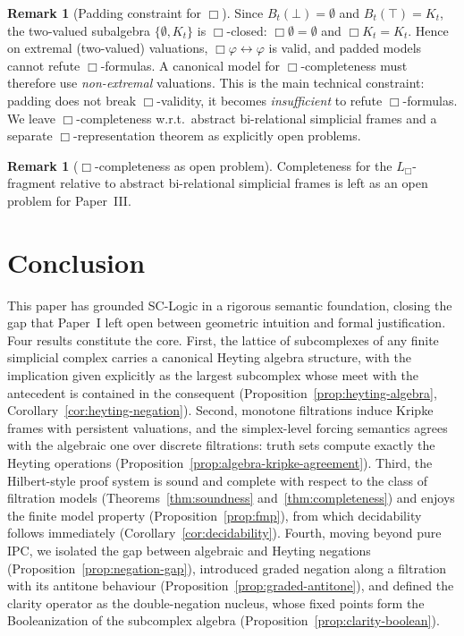 \documentclass[final,12pt]{elsarticle}
\theoremstyle{plain}
\theoremstyle{definition}
\newtheorem{rem}[thm]{Remark}
\begin{document}
\begin{rem}[Padding constraint for \(\Box\)]
\label{rem:box-padding}
Since \(B_t(\bot)=\emptyset\) and \(B_t(\top)=K_t\), the two-valued subalgebra
\(\{\emptyset, K_t\}\) is \(\Box\)-closed: \(\Box\emptyset=\emptyset\) and
\(\Box K_t=K_t\).  Hence on extremal (two-valued) valuations,
\(\Box\varphi\leftrightarrow\varphi\) is valid, and padded models cannot
refute \(\Box\)-formulas.  A canonical model for \(\Box\)-completeness must
therefore use \emph{non-extremal} valuations.  This is the main technical
constraint: padding does not break \(\Box\)-validity, it becomes
\emph{insufficient} to refute \(\Box\)-formulas.  We leave
\(\Box\)-completeness w.r.t.\ abstract bi-relational simplicial frames and
a separate \(\Box\)-representation theorem as explicitly open problems.
\end{rem}

\begin{rem}[\(\Box\)-completeness as open problem]
Completeness for the \(L_{\Box}\)-fragment relative to abstract
bi-relational simplicial frames is left as an open problem for
Paper~III.
\end{rem}

\section{Conclusion}
\label{sec:conclusion}

This paper has grounded SC-Logic in a rigorous semantic foundation, closing the gap that Paper~I left open between geometric intuition and formal justification. Four results constitute the core. First, the lattice of subcomplexes of any finite simplicial complex carries a canonical Heyting algebra structure, with the implication given explicitly as the largest subcomplex whose meet with the antecedent is contained in the consequent (Proposition~\ref{prop:heyting-algebra}, Corollary~\ref{cor:heyting-negation}). Second, monotone filtrations induce Kripke frames with persistent valuations, and the simplex-level forcing semantics agrees with the algebraic one over discrete filtrations: truth sets compute exactly the Heyting operations (Proposition~\ref{prop:algebra-kripke-agreement}). Third, the Hilbert-style proof system is sound and complete with respect to the class of filtration models (Theorems~\ref{thm:soundness} and~\ref{thm:completeness}) and enjoys the finite model property (Proposition~\ref{prop:fmp}), from which decidability follows immediately (Corollary~\ref{cor:decidability}). Fourth, moving beyond pure IPC, we isolated the gap between algebraic and Heyting negations (Proposition~\ref{prop:negation-gap}), introduced graded negation along a filtration with its antitone behaviour (Proposition~\ref{prop:graded-antitone}), and defined the clarity operator as the double-negation nucleus, whose fixed points form the Booleanization of the subcomplex algebra (Proposition~\ref{prop:clarity-boolean}).
\end{document}
